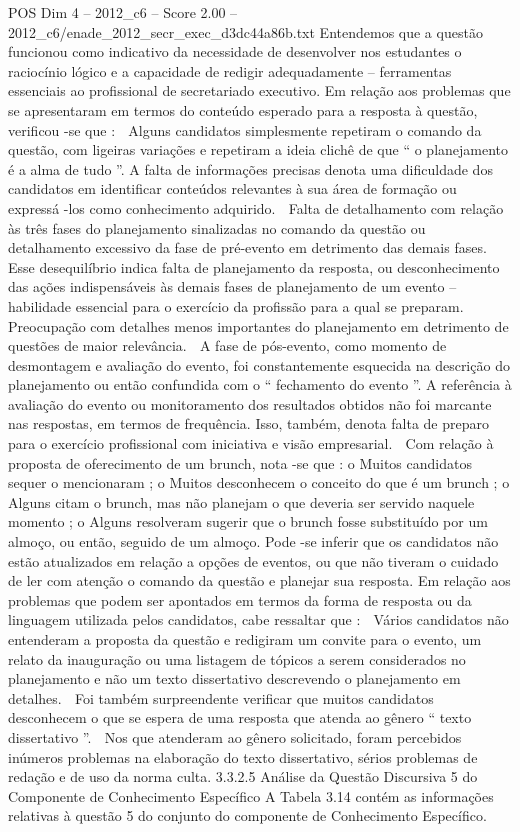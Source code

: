 \begin{textsample}{POS Dim 4 – 2012\_c6 – Score 2.00 – 2012\_c6/enade\_2012\_secr\_exec\_d3dc44a86b.txt}
Entendemos que a questão funcionou como indicativo da necessidade de desenvolver nos estudantes o raciocínio lógico e a capacidade de redigir adequadamente – ferramentas essenciais ao profissional de secretariado executivo.
Em relação aos problemas que se apresentaram em termos do conteúdo esperado para a resposta à questão, verificou -se que :  Alguns candidatos simplesmente repetiram o comando da questão, com ligeiras variações e repetiram a ideia clichê de que “ o planejamento é a alma de tudo ”.
A falta de informações precisas denota uma dificuldade dos candidatos em identificar conteúdos relevantes à sua área de formação ou expressá -los como conhecimento adquirido.  Falta de detalhamento com relação às três fases do planejamento sinalizadas no comando da questão ou detalhamento excessivo da fase de pré-evento em detrimento das demais fases.
Esse desequilíbrio indica falta de planejamento da resposta, ou desconhecimento das ações indispensáveis às demais fases de planejamento de um evento – habilidade essencial para o exercício da profissão para a qual se preparam.  Preocupação com detalhes menos importantes do planejamento em detrimento de questões de maior relevância.  A fase de pós-evento, como momento de desmontagem e avaliação do evento, foi constantemente esquecida na descrição do planejamento ou então confundida com o “ fechamento do evento ”.
A referência à avaliação do evento ou monitoramento dos resultados obtidos não foi marcante nas respostas, em termos de frequência.
Isso, também, denota falta de preparo para o exercício profissional com iniciativa e visão empresarial.  Com relação à proposta de oferecimento de um brunch, nota -se que : o Muitos candidatos sequer o mencionaram ; o Muitos desconhecem o conceito do que é um brunch ; o Alguns citam o brunch, mas não planejam o que deveria ser servido naquele momento ; o Alguns resolveram sugerir que o brunch fosse substituído por um almoço, ou então, seguido de um almoço.
Pode -se inferir que os candidatos não estão atualizados em relação a opções de eventos, ou que não tiveram o cuidado de ler com atenção o comando da questão e planejar sua resposta.
Em relação aos problemas que podem ser apontados em termos da forma de resposta ou da linguagem utilizada pelos candidatos, cabe ressaltar que :  Vários candidatos não entenderam a proposta da questão e redigiram um convite para o evento, um relato da inauguração ou uma listagem de tópicos a serem considerados no planejamento e não um texto dissertativo descrevendo o planejamento em detalhes.  Foi também surpreendente verificar que muitos candidatos desconhecem o que se espera de uma resposta que atenda ao gênero “ texto dissertativo ”.  Nos que atenderam ao gênero solicitado, foram percebidos inúmeros problemas na elaboração do texto dissertativo, sérios problemas de redação e de uso da norma culta. 3.3.2.5 Análise da Questão Discursiva 5 do Componente de Conhecimento Específico A Tabela 3.14 contém as informações relativas à questão 5 do conjunto do componente de Conhecimento Específico.

\end{textsample}
